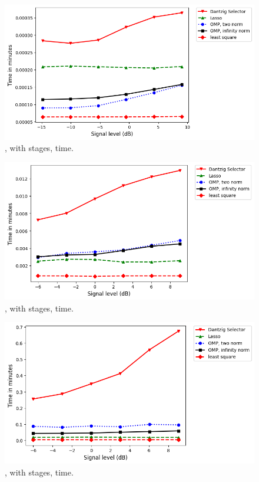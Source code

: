 \begin {figure} [H]
\includegraphics [width = \textwidth] {time-small-square-two.png}
\caption {, with  stages, time.}
\end {figure}


\begin {figure} [H]
\includegraphics [width = \textwidth] {time-medium-square-two.png}
\caption {, with  stages, time.}
\end {figure}


\begin {figure} [H]
\includegraphics [width = \textwidth] {time-big-square-two.png}
\caption {, with  stages, time.}
\end {figure}



